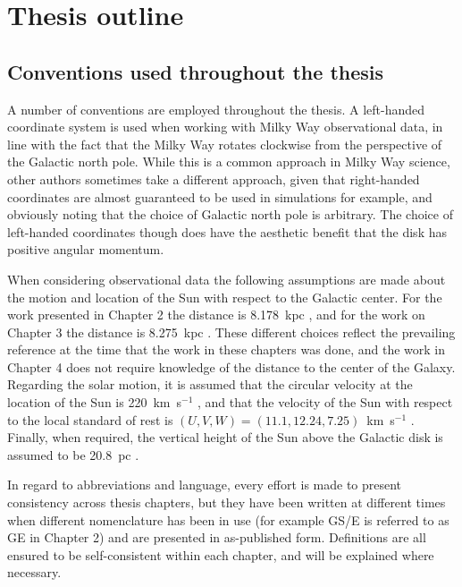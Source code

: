 \section{Thesis outline}



\subsection{Conventions used throughout the thesis}

A number of conventions are employed throughout the thesis. A left-handed coordinate system is used when working with Milky Way observational data, in line with the fact that the Milky Way rotates clockwise from the perspective of the Galactic north pole. While this is a common approach in Milky Way science, other authors sometimes take a different approach, given that right-handed coordinates are almost guaranteed to be used in simulations for example, and obviously noting that the choice of Galactic north pole is arbitrary. The choice of left-handed coordinates though does have the aesthetic benefit that the disk has positive angular momentum.

When considering observational data the following assumptions are made about the motion and location of the Sun with respect to the Galactic center. For the work presented in Chapter 2 the distance is 8.178~kpc \parencite{gravity19}, and for the work on Chapter 3 the distance is 8.275~kpc \parencite{gravity21}. These different choices reflect the prevailing reference at the time that the work in these chapters was done, and the work in Chapter 4 does not require knowledge of the distance to the center of the Galaxy. Regarding the solar motion, it is assumed that the circular velocity at the location of the Sun is 220~km~s$^{-1}$ \parencite[e.g.][]{bovy12a}, and that the velocity of the Sun with respect to the local standard of rest is $(U,V,W) = (11.1,12.24,7.25)$~km~s$^{-1}$ \parencite{schoenrich10}. Finally, when required, the vertical height of the Sun above the Galactic disk is assumed to be 20.8~pc \parencite{bennett19}.

In regard to abbreviations and language, every effort is made to present consistency across thesis chapters, but they have been written at different times when different nomenclature has been in use (for example GS/E is referred to as GE in Chapter 2) and are presented in as-published form. Definitions are all ensured to be self-consistent within each chapter, and will be explained where necessary.

